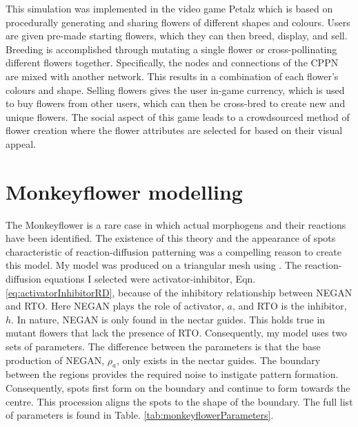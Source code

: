 This simulation was implemented in the video game Petalz which is based on procedurally generating and sharing flowers of different shapes and colours. Users are given pre-made starting flowers, which they can then breed, display, and sell. Breeding is accomplished through mutating a single flower or cross-pollinating different flowers together. Specifically, the nodes and connections of the CPPN are mixed with another network. This results in a combination of each flower's colours and shape. Selling flowers gives the user in-game currency, which is used to buy flowers from other users, which can then be cross-bred to create new and unique flowers. The social aspect of this game leads to a crowdsourced method of flower creation where the flower attributes are selected for based on their visual appeal.

\section{Monkeyflower modelling}
The Monkeyflower is a rare case in which actual morphogens and their reactions have been identified. The existence of this theory and the appearance of spots characteristic of reaction-diffusion patterning was a compelling reason to create this model. My model was produced on a triangular mesh using \ProgramName{}. The reaction-diffusion equations I selected were activator-inhibitor, Eqn. \eqref{eq:activatorInhibitorRD}, because of the inhibitory relationship between NEGAN and RTO. Here NEGAN plays the role of activator, $a$, and RTO is the inhibitor, $h$. In nature, NEGAN is only found in the nectar guides. This holds true in mutant flowers that lack the presence of RTO. Consequently, my model uses two sets of parameters. The difference between the parameters is that the base production of NEGAN, $\rho_a$, only exists in the nectar guides. The boundary between the regions provides the required noise to instigate pattern formation. Consequently, spots first form on the boundary and continue to form towards the centre. This procession aligns the spots to the shape of the boundary. The full list of parameters is found in Table. \ref{tab:monkeyflowerParameters}.

\begin{table}[ht]
	\centering
	\caption[Parameters for the monkeyflower model using activator-inhibitor equations]{Parameters for the monkeyflower model using activator-inhibitor equations (Eqn. \ref{eq:activatorInhibitorRD}). The  value after the comma is used at the periphery. The initial morphogen distribution has NEGAN $= 0$ and RTO $= 1$ everywhere.}
	\label{tab:monkeyflowerParameters}
\end{table}

